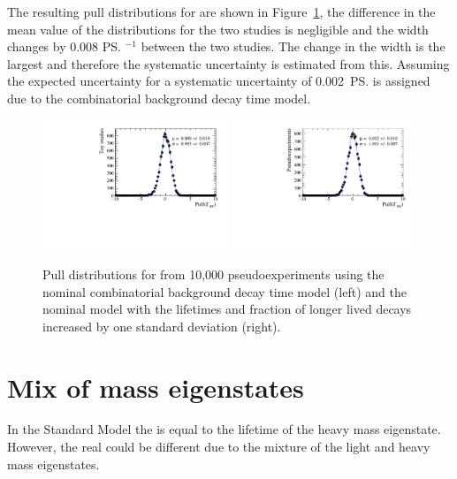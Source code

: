 The resulting pull distributions for \Gmumu are shown in Figure~\ref{fig:CBGextreme}, the difference in the mean value of the distributions for the two studies is negligible and the width changes by 0.008 \ps$^{-1}$ between the two studies. The change in the width is the largest and therefore the systematic uncertainty is estimated from this. Assuming the expected uncertainty for \tmumu a systematic uncertainty of 0.002~\ps is assigned due to the combinatorial background decay time model.

\begin{figure}[htbp]
  \centering
    \includegraphics[width=0.49\textwidth]{./Figs/LifetimeSystematics/Gamma_pull_mass_pdf_Run1.pdf}
    \includegraphics[width=0.49\textwidth]{./Figs/LifetimeSystematics/Bs2MuMu_gamma_pull_CKM_extremeCBG_DT.pdf}
  \caption{Pull distributions for \Gmumu from 10,000 pseudoexperiments using the nominal combinatorial background decay time model (left) and the nominal model with the lifetimes and fraction of longer lived decays increased by one standard deviation (right).}
  \label{fig:CBGextreme}
\end{figure}


\section[Mix of \bs mass eigenstates]{Mix of \boldmath{\bs} mass eigenstates}
\label{sec:mixofeigenstates}

In the Standard Model the \bsmumu \el is equal to the lifetime of the heavy \bs mass eigenstate. However, the real \bsmumu \el could be different due to the mixture of the light and heavy mass eigenstates. %

